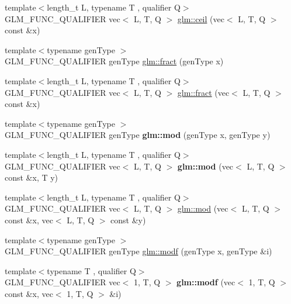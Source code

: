 \begin{DoxyCompactItemize}
{\footnotesize template$<$length\+\_\+t L, typename T , qualifier Q$>$ }\\G\+L\+M\+\_\+\+F\+U\+N\+C\+\_\+\+Q\+U\+A\+L\+I\+F\+I\+ER vec$<$ L, T, Q $>$ \hyperlink{group__core__func__common_gafb9d2a645a23aca12d4d6de0104b7657}{glm\+::ceil} (vec$<$ L, T, Q $>$ const \&x)
\item 
{\footnotesize template$<$typename gen\+Type $>$ }\\G\+L\+M\+\_\+\+F\+U\+N\+C\+\_\+\+Q\+U\+A\+L\+I\+F\+I\+ER gen\+Type \hyperlink{group__core__func__common_ga8ba89e40e55ae5cdf228548f9b7639c7}{glm\+::fract} (gen\+Type x)
\item 
{\footnotesize template$<$length\+\_\+t L, typename T , qualifier Q$>$ }\\G\+L\+M\+\_\+\+F\+U\+N\+C\+\_\+\+Q\+U\+A\+L\+I\+F\+I\+ER vec$<$ L, T, Q $>$ \hyperlink{group__core__func__common_ga2df623004f634b440d61e018d62c751b}{glm\+::fract} (vec$<$ L, T, Q $>$ const \&x)
\item 
{\footnotesize template$<$typename gen\+Type $>$ }\\G\+L\+M\+\_\+\+F\+U\+N\+C\+\_\+\+Q\+U\+A\+L\+I\+F\+I\+ER gen\+Type {\bfseries glm\+::mod} (gen\+Type x, gen\+Type y)
\item 
{\footnotesize template$<$length\+\_\+t L, typename T , qualifier Q$>$ }\\G\+L\+M\+\_\+\+F\+U\+N\+C\+\_\+\+Q\+U\+A\+L\+I\+F\+I\+ER vec$<$ L, T, Q $>$ {\bfseries glm\+::mod} (vec$<$ L, T, Q $>$ const \&x, T y)
\item 
{\footnotesize template$<$length\+\_\+t L, typename T , qualifier Q$>$ }\\G\+L\+M\+\_\+\+F\+U\+N\+C\+\_\+\+Q\+U\+A\+L\+I\+F\+I\+ER vec$<$ L, T, Q $>$ \hyperlink{group__core__func__common_ga9b197a452cd52db3c5c18bac72bd7798}{glm\+::mod} (vec$<$ L, T, Q $>$ const \&x, vec$<$ L, T, Q $>$ const \&y)
\item 
{\footnotesize template$<$typename gen\+Type $>$ }\\G\+L\+M\+\_\+\+F\+U\+N\+C\+\_\+\+Q\+U\+A\+L\+I\+F\+I\+ER gen\+Type \hyperlink{group__core__func__common_ga85e33f139b8db1b39b590a5713b9e679}{glm\+::modf} (gen\+Type x, gen\+Type \&i)
\item 
\mbox{\label{func__common_8inl_ae1f87270f9792f92fd1bbc769564e8e3}} 
{\footnotesize template$<$typename T , qualifier Q$>$ }\\G\+L\+M\+\_\+\+F\+U\+N\+C\+\_\+\+Q\+U\+A\+L\+I\+F\+I\+ER vec$<$ 1, T, Q $>$ {\bfseries glm\+::modf} (vec$<$ 1, T, Q $>$ const \&x, vec$<$ 1, T, Q $>$ \&i)

\end{DoxyCompactItemize}
